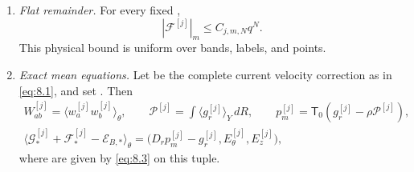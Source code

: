 \begin{proposition}
\begin{enumerate}[label=(\roman*)]
\[\qquad
f_{\gamma,m}^{[j]}\in C^\infty(\mathcal E_\gamma^+;\mathbb C^3),
\]
with smooth zero extension across the fixed slow and transverse supports and the enlarged local
torus rectangle. Let  be any lower bounds for the wave and mean
exponents furnished by
%
applying Propositions~\ref{prop:9.1}, \ref{prop:7.2}, \ref{prop:6.6} and \ref{prop:7.6},
Section~\ref{sec:8},
and Lemma~\ref{lem:9.2} along this finite sequence. Then
\[
f_{\gamma,m}^{[j]}\in \mathsf W_\alpha,
\qquad
\langle\mathcal G_*^{[j]}\rangle_\theta\in \mathsf M_\mu.
\]
The mean coefficients have smooth zero extension outside the active shell. The next pulse inverse is
applied precisely to the coefficients  in \eqref{eq:9.4}.

\item \emph{Flat remainder.} For every fixed ,
\begin{equation}
|\mathcal F^{[j]}|_m\le C_{j,m,N}q^N.
\tag{9.5}\label{eq:9.5}
\end{equation}
This physical bound is uniform over bands, labels, and points.

\item \emph{Exact mean equations.} Let
 be the complete current velocity
correction as in \eqref{eq:8.1}, and set
. Then
\begin{equation}
\begin{gathered}
W_{ab}^{[j]}=\langle w_a^{[j]}w_b^{[j]}\rangle_\theta,
\qquad
\mathcal P^{[j]}=\int\langle g_r^{[j]}\rangle_Y\,dR,
\qquad
p_m^{[j]}=\mathsf T_0(g_r^{[j]}-\rho\mathcal P^{[j]}),\\
\langle\mathcal G_*^{[j]}+\mathcal F_*^{[j]}-\mathcal E_{B,*}\rangle_\theta
=\bigl(D_r p_m^{[j]}-g_r^{[j]},E_\theta^{[j]},E_z^{[j]}\bigr),
\end{gathered}
\tag{9.6}\label{eq:9.6}
\end{equation}
where  are given by \eqref{eq:8.3} on
this tuple.
\end{enumerate}
\end{proposition}

